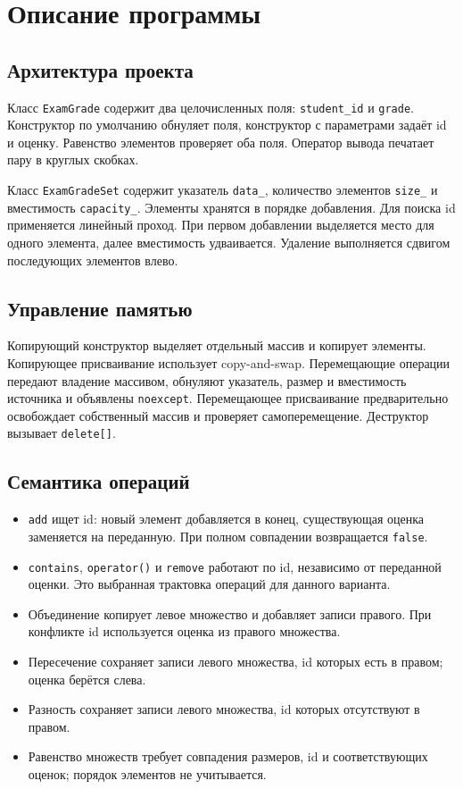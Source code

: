 \section{Описание программы}

\subsection{Архитектура проекта}

Класс \texttt{ExamGrade} содержит два целочисленных поля: \texttt{student\_id} и \texttt{grade}. Конструктор по умолчанию обнуляет поля, конструктор с параметрами задаёт id и оценку. Равенство элементов проверяет оба поля. Оператор вывода печатает пару в круглых скобках.

Класс \texttt{ExamGradeSet} содержит указатель \texttt{data\_}, количество элементов \texttt{size\_} и вместимость \texttt{capacity\_}. Элементы хранятся в порядке добавления. Для поиска id применяется линейный проход. При первом добавлении выделяется место для одного элемента, далее вместимость удваивается. Удаление выполняется сдвигом последующих элементов влево.

\subsection{Управление памятью}

Копирующий конструктор выделяет отдельный массив и копирует элементы. Копирующее присваивание использует copy-and-swap. Перемещающие операции передают владение массивом, обнуляют указатель, размер и вместимость источника и объявлены \texttt{noexcept}. Перемещающее присваивание предварительно освобождает собственный массив и проверяет самоперемещение. Деструктор вызывает \texttt{delete[]}.

\subsection{Семантика операций}

\begin{itemize}
  \item \texttt{add} ищет id: новый элемент добавляется в конец, существующая оценка заменяется на переданную. При полном совпадении возвращается \texttt{false}.
  \item \texttt{contains}, \texttt{operator()} и \texttt{remove} работают по id, независимо от переданной оценки. Это выбранная трактовка операций для данного варианта.
  \item Объединение копирует левое множество и добавляет записи правого. При конфликте id используется оценка из правого множества.
  \item Пересечение сохраняет записи левого множества, id которых есть в правом; оценка берётся слева.
  \item Разность сохраняет записи левого множества, id которых отсутствуют в правом.
  \item Равенство множеств требует совпадения размеров, id и соответствующих оценок; порядок элементов не учитывается.
\end{itemize}

